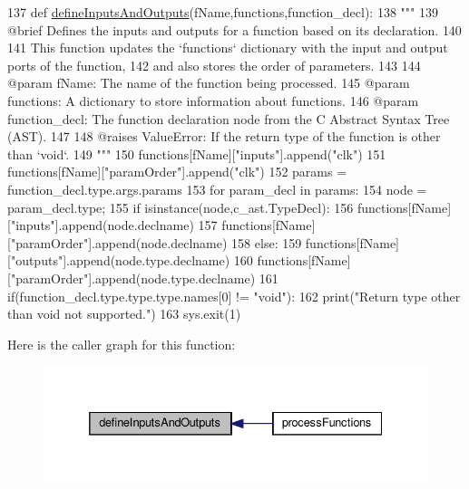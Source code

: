 \begin{DoxyCode}
137 \textcolor{keyword}{def }\hyperlink{namespaceutils_ad890ef664f4412df3dbe4f96f71261bd}{defineInputsAndOutputs}(fName,functions,function\_decl):
138     \textcolor{stringliteral}{"""
}
139 \textcolor{stringliteral}{    @brief Defines the inputs and outputs for a function based on its declaration.
}
140 \textcolor{stringliteral}{
}
141 \textcolor{stringliteral}{    This function updates the `functions` dictionary with the input and output ports of the function,
}
142 \textcolor{stringliteral}{    and also stores the order of parameters.
}
143 \textcolor{stringliteral}{
}
144 \textcolor{stringliteral}{    @param fName: The name of the function being processed.
}
145 \textcolor{stringliteral}{    @param functions: A dictionary to store information about functions.
}
146 \textcolor{stringliteral}{    @param function\_decl: The function declaration node from the C Abstract Syntax Tree (AST).
}
147 \textcolor{stringliteral}{
}
148 \textcolor{stringliteral}{    @raises ValueError: If the return type of the function is other than `void`.
}
149 \textcolor{stringliteral}{    """}
150     functions[fName][\textcolor{stringliteral}{"inputs"}].append(\textcolor{stringliteral}{"clk"})
151     functions[fName][\textcolor{stringliteral}{"paramOrder"}].append(\textcolor{stringliteral}{"clk"})
152     params = function\_decl.type.args.params
153     \textcolor{keywordflow}{for} param\_decl \textcolor{keywordflow}{in} params:
154         node = param\_decl.type;
155         \textcolor{keywordflow}{if} isinstance(node,c\_ast.TypeDecl):
156             functions[fName][\textcolor{stringliteral}{"inputs"}].append(node.declname)
157             functions[fName][\textcolor{stringliteral}{"paramOrder"}].append(node.declname)
158         \textcolor{keywordflow}{else}:
159             functions[fName][\textcolor{stringliteral}{"outputs"}].append(node.type.declname)
160             functions[fName][\textcolor{stringliteral}{"paramOrder"}].append(node.type.declname)
161     if(function\_decl.type.type.type.names[0] != \textcolor{stringliteral}{"void"}):
162         print(\textcolor{stringliteral}{"Return type other than void not supported."})
163         sys.exit(1)
\end{DoxyCode}
Here is the caller graph for this function\+:\nopagebreak
\begin{figure}[H]
\begin{center}
\leavevmode
\includegraphics[width=332pt]{namespaceutils_ad890ef664f4412df3dbe4f96f71261bd_icgraph}
\end{center}
\end{figure}
\mbox{\label{namespaceutils_a01c8b36149daaab35946bf42cf90fcc1}} 
